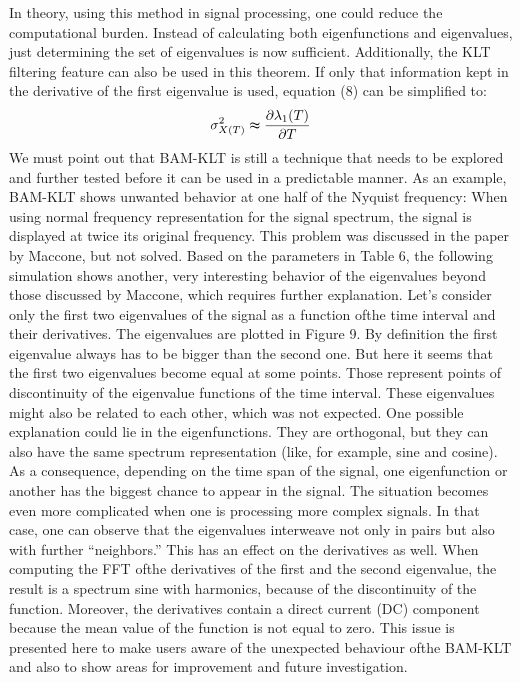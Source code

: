 \documentclass[12pt]{report}
\begin{document}
In theory, using this method in signal processing, one could reduce the computational burden. Instead of calculating both eigenfunctions and eigenvalues, just determining the set of eigenvalues is now sufficient. Additionally, the KLT filtering feature can also be used in this theorem. If only that information kept in the derivative of the first eigenvalue is used, equation (8) can be simplified to:
\begin{equation}
	\sigma_{X(T)}^2 \thickapprox \pdv{\lambda_1(T)}{T}
	\label{eq:9}
\end{equation}
We must point out that BAM-KLT is still a technique that needs to be explored and further tested before it can be used in a predictable manner.
As an example, BAM-KLT shows unwanted behavior at one half of the Nyquist frequency: When using normal frequency representation for the signal spectrum, the signal is displayed at twice its original frequency. This problem was discussed in the paper by Maccone, but not solved.
Based on the parameters in Table 6, the following simulation shows another, very interesting behavior of the eigenvalues beyond those discussed by Maccone, which requires further explanation.
Let's consider only the first two eigenvalues of the signal as a function ofthe time interval and their derivatives. The eigenvalues are plotted in Figure 9. By definition the first eigenvalue always has to be bigger than the second one. But here it seems that the first two eigenvalues become equal at some points. Those represent points of discontinuity of the eigenvalue functions of the time interval. These eigenvalues might also be related to each other, which was not expected.
One possible explanation could lie in the eigenfunctions. They are orthogonal, but they can also have the same spectrum representation (like, for example, sine and cosine). As a consequence, depending on the time span of the signal, one eigenfunction or another has the biggest chance to appear in the signal.
The situation becomes even more complicated when one is processing more complex signals. In that case, one can observe that the eigenvalues interweave not only in pairs but also with further “neighbors.”
This has an effect on the derivatives as well. When computing the FFT ofthe derivatives of the first and the second eigenvalue, the result is a spectrum sine with harmonics, because of the discontinuity of the function. Moreover, the derivatives contain a direct current (DC) component because the mean value of the function is not equal to zero.
This issue is presented here to make users aware of the unexpected behaviour ofthe BAM-KLT and also to show areas for improvement and future investigation.
\end{document}
